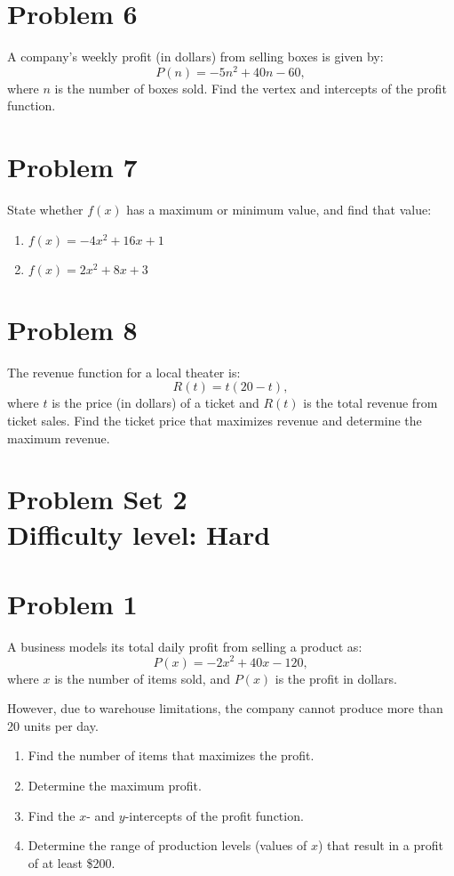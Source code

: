 \documentclass[12pt]{article}
\begin{document}
\section*{Problem 6}
A company’s weekly profit (in dollars) from selling boxes is given by:
\[
P(n) = -5n^2 + 40n - 60,
\]
where \( n \) is the number of boxes sold. Find the vertex and intercepts of the profit function.

\section*{Problem 7}
State whether \( f(x) \) has a maximum or minimum value, and find that value:
\begin{enumerate}[label=(\alph*)]
    \item \( f(x) = -4x^2 + 16x + 1 \)
    \item \( f(x) = 2x^2 + 8x + 3 \)
\end{enumerate}

\section*{Problem 8}
The revenue function for a local theater is:
\[
R(t) = t(20 - t),
\]
where \( t \) is the price (in dollars) of a ticket and \( R(t) \) is the total revenue from ticket sales. Find the ticket price that maximizes revenue and determine the maximum revenue.

\section*{Problem Set 2\\Difficulty level: Hard}
\section*{Problem 1}
A business models its total daily profit from selling a product as:
\[
P(x) = -2x^2 + 40x - 120,
\]
where \( x \) is the number of items sold, and \( P(x) \) is the profit in dollars.

However, due to warehouse limitations, the company cannot produce more than 20 units per day.

\begin{enumerate}[label=(\alph*)]
    \item Find the number of items that maximizes the profit.
    \item Determine the maximum profit.
    \item Find the \( x \)- and \( y \)-intercepts of the profit function.
    \item Determine the range of production levels (values of \( x \)) that result in a profit of at least \$200.
\end{enumerate}
\end{document}
